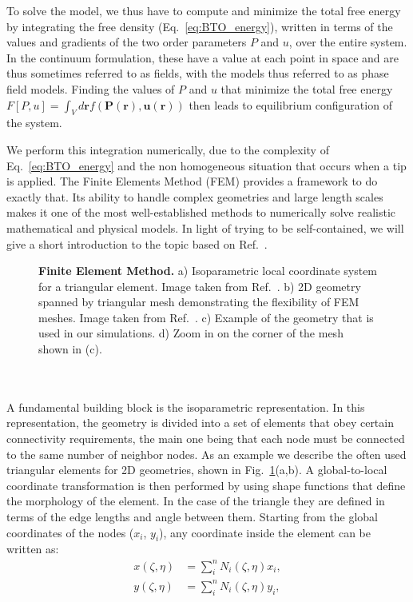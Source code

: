 To solve the model, we thus have to compute and minimize the total free energy by integrating the free density (Eq.~\eqref{eq:BTO_energy}), written in terms of the values and gradients of the two order parameters $P$ and $u$, over the entire system.
In the continuum formulation, these have a value at each point in space and are thus sometimes referred to as fields, with the models thus referred to as phase field models.
Finding the values of $P$ and $u$ that minimize the total free energy $F[P,u]=\int_V d\bm{r} f(\bm{P}(\bm{r}),\bm{u}(\bm{r}))$ then leads to equilibrium configuration of the system.

We perform this integration numerically, due to the complexity of Eq.~\eqref{eq:BTO_energy} and the non homogeneous situation that occurs when a tip is applied.
The Finite Elements Method (FEM) provides a framework to do exactly that.
Its ability to handle complex geometries and large length scales makes it one of the most well-established methods to numerically solve realistic mathematical and physical models.
In light of trying to be self-contained, we will give a short introduction to the topic based on Ref.~\cite{Biner}.
\begin{figure}
	\caption{\label{fig:BTO_fem}{\bf Finite Element Method.} a) Isoparametric local coordinate system for a triangular element. Image taken from Ref.~\cite{Biner}. b) 2D geometry spanned by triangular mesh demonstrating the flexibility of FEM meshes. Image taken from Ref.~\cite{2Dmesh}. c) Example of the geometry that is used in our simulations. d) Zoom in on the corner of the mesh shown in (c).}
\end{figure}
\\\\
A fundamental building block is the isoparametric representation.
In this representation, the geometry is divided into a set of elements that obey certain connectivity requirements, the main one being that each node must be connected to the same number of neighbor nodes.
As an example we describe the often used triangular elements for 2D geometries, shown in Fig.~\ref{fig:BTO_fem}(a,b).
A global-to-local coordinate transformation is then performed by using shape functions that define the morphology of the element.
In the case of the triangle they are defined in terms of the edge lengths and angle between them. 
Starting from the global coordinates of the nodes ($x_i$, $y_i$), any coordinate inside the element can be written as:
\begin{align}
x(\zeta, \eta) &= \sum_i^n N_i(\zeta, \eta) x_i,\\
y(\zeta, \eta) &= \sum_i^n N_i(\zeta, \eta) y_i,
\end{align}
